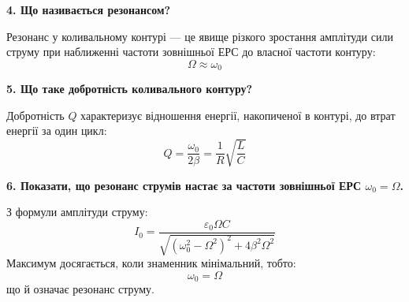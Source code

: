 \documentclass[12pt,a4paper]{article}
\begin{document}
    \vspace{1em}

    \textbf{4. Що називається резонансом?}

    Резонанс у коливальному контурі — це явище різкого зростання амплітуди сили струму при наближенні частоти зовнішньої ЕРС до власної частоти контуру:
    \[
    \Omega \approx \omega_0
    \]

    \vspace{1em}

    \textbf{5. Що таке добротність коливального контуру?}

    Добротність \( Q \) характеризує відношення енергії, накопиченої в контурі, до втрат енергії за один цикл:
    \[
    Q = \frac{\omega_0}{2\beta} = \frac{1}{R} \sqrt{\frac{L}{C}}
    \]

    \vspace{1em}

    \textbf{6. Показати, що резонанс струмів настає за частоти зовнішньої ЕРС \( \omega_0 = \Omega \).}

    З формули амплітуди струму:
    \[
    I_0 = \frac{\varepsilon_0 \Omega C}{\sqrt{(\omega_0^2 - \Omega^2)^2 + 4\beta^2 \Omega^2}}
    \]
    Максимум досягається, коли знаменник мінімальний, тобто:
    \[
    \omega_0 = \Omega
    \]
    що й означає резонанс струму.
\end{document}
